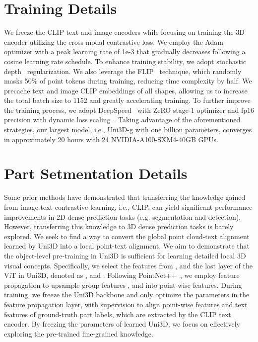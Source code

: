 \documentclass{article} \usepackage{iclr2024_conference,times}
\def\Ours{Uni3D\xspace}
\begin{document}
\section{Training Details}
\label{sec.m4}
We freeze the CLIP text and image encoders while focusing on training the 3D encoder utilizing the cross-modal contrastive loss. We employ the Adam~\citep{kingma2014adam} optimizer with a peak learning rate of 1e-3 that gradually decreases following a cosine learning rate schedule. To enhance training stability, we adopt stochastic depth~\citep{huang2016deep} regularization.
We also leverage the FLIP~\citep{li2023scaling} technique, which randomly masks 50\% of point tokens during training, reducing time complexity by half. 
We precache text and image CLIP embeddings of all shapes, allowing us to increase the total batch size to 1152 and greatly accelerating training. To further improve the training process, we adopt DeepSpeed~\citep{rasley2020deepspeed} with ZeRO stage-1 optimizer and fp16 precision with dynamic loss scaling~\citep{rajbhandari2020zero}. 
Taking advantage of the aforementioned strategies, our largest model, i.e., Uni3D-g with one billion parameters, converges in approximately 20 hours with 24  NVIDIA-A100-SXM4-40GB GPUs.




\section{Part Setmentation Details}
\label{sec.appendP}
Some prior methods \citep{rao2022denseclip,yang2022lavt} have demonstrated that transferring the knowledge gained from image-text contrastive learning, i.e., CLIP, can yield significant performance improvements in 2D dense prediction tasks (e.g. segmentation and detection). However, transferring this knowledge to 3D dense prediction tasks is barely explored. We seek to find a way to convert the global point cloud-text alignment learned by \Ours into a local point-text alignment. We aim to demonstrate that the object-level  pre-training in \Ours is sufficient for learning detailed local 3D visual concepts. 
Specifically, we select the features from ,  and the last layer of the ViT in \Ours, denoted as ,  and . Following PointNet++~\citep{qi2017pointnet++}, we employ feature propagation to upsample group features ,  and  into point-wise features. During training, we freeze the \Ours backbone and only optimize the parameters in the feature propagation layer, with supervision to align point-wise features and text features of ground-truth part labels, which are extracted by the CLIP text encoder. 
By freezing the parameters of learned \Ours, we focus on effectively exploring the pre-trained fine-grained knowledge.
\end{document}

